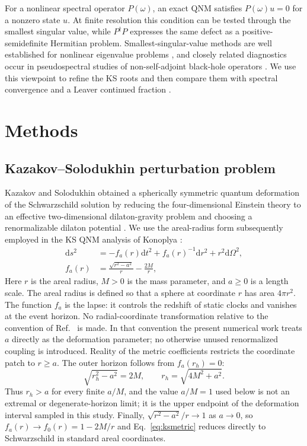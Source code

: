 \documentclass[12pt,a4paper]{article}
\newcommand{\dd}{\mathrm{d}}
\begin{document}
\color{blue}
For a nonlinear spectral operator \(P(\omega)\), an exact QNM satisfies
\(P(\omega)u=0\) for a nonzero state \(u\). At finite resolution this condition
can be tested through the smallest singular value, while \(P^\dagger P\)
expresses the same defect as a positive-semidefinite Hermitian problem.
Smallest-singular-value methods are well established for nonlinear eigenvalue
problems \cite{Sadkane2023}, and closely related diagnostics occur in
pseudospectral studies of non-self-adjoint black-hole operators
\cite{Jaramillo2021,Cao2024}. We use this viewpoint to refine the KS roots and
then compare them with spectral convergence and a Leaver continued fraction
\cite{Leaver1985,Jansen2017}.
\color{black}

\section{Methods}

\subsection{Kazakov--Solodukhin perturbation problem}

\color{blue}
Kazakov and Solodukhin obtained a spherically symmetric quantum deformation of
the Schwarzschild solution by reducing the four-dimensional Einstein theory to
an effective two-dimensional dilaton-gravity problem and choosing a
renormalizable dilaton potential \cite{Kazakov1994}.  We use the areal-radius
form subsequently employed in the KS QNM analysis of Konoplya
\cite{Konoplya2020}:
\color{black}
\begin{equation}
\begin{aligned}
\dd s^2 &=
-f_a(r)\dd t^2 + f_a(r)^{-1}\dd r^2
+ r^2 \dd\Omega^2,\\
f_a(r)&=\frac{\sqrt{r^2-a^2}}{r}-\frac{2M}{r},
\end{aligned}
\label{eq:ksmetric}
\end{equation}
\color{blue}
Here \(r\) is the areal radius, \(M>0\) is the mass parameter, and \(a\geq0\)
is a length scale.  The areal radius is defined so that a sphere at coordinate
\(r\) has area \(4\pi r^2\).  The function \(f_a\) is the lapse: it controls
the redshift of static clocks and vanishes at the event horizon.  No radial-coordinate transformation relative to the
convention of Ref.~\cite{Konoplya2020} is made.  In that convention the
present numerical work treats \(a\) directly as the deformation parameter;
no otherwise unused renormalized coupling is introduced.  Reality of the metric coefficients restricts the
coordinate patch to \(r\geq a\).  The outer horizon follows from
\(f_a(r_h)=0\):
\begin{equation}
\sqrt{r_h^2-a^2}=2M,
\qquad
r_h=\sqrt{4M^2+a^2}.
\label{eq:horizonradius}
\end{equation}
Thus \(r_h>a\) for every finite \(a/M\), and the value \(a/M=1\) used below is
not an extremal or degenerate-horizon limit; it is the upper endpoint of the
deformation interval sampled in this study.  Finally,
\(\sqrt{r^2-a^2}/r\to1\) as \(a\to0\), so
\(f_a(r)\to f_0(r)=1-2M/r\) and Eq.~\eqref{eq:ksmetric} reduces directly to
Schwarzschild in standard areal coordinates.
\color{black}
\end{document}
